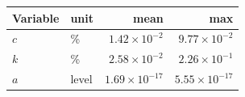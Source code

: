 \begin{tabular}{llrr}
\toprule
Variable & unit & mean & max \\
\midrule
$c$ & \% & $1.42\times10^{-2}$ & $9.77\times10^{-2}$ \\
$k$ & \% & $2.58\times10^{-2}$ & $2.26\times10^{-1}$ \\
$a$ & level & $1.69\times10^{-17}$ & $5.55\times10^{-17}$ \\
\bottomrule
\end{tabular}
